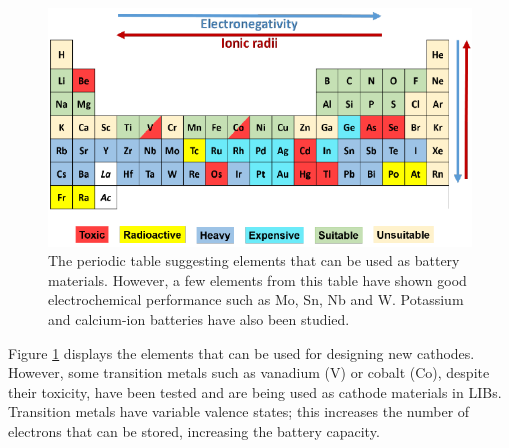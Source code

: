 \begin{figure}[h!]
\centering
\includegraphics[width=\textwidth]{Figures/chap1fig/pertab}
\caption{The periodic table suggesting elements that can be used as battery materials. However, a few elements from this table have shown good electrochemical performance such as Mo, Sn, Nb and W. Potassium and calcium-ion batteries have also been studied.}
\label{Figures/chap1fig:pertab}
\end{figure}

Figure \ref{Figures/chap1fig:pertab} displays the elements that can be used for designing new cathodes. However, some transition metals such as vanadium (V) or cobalt (Co), despite their toxicity, have been tested and are being used as cathode materials in LIBs. Transition metals have variable valence states; this increases the number of electrons that can be stored, increasing the battery capacity. 


